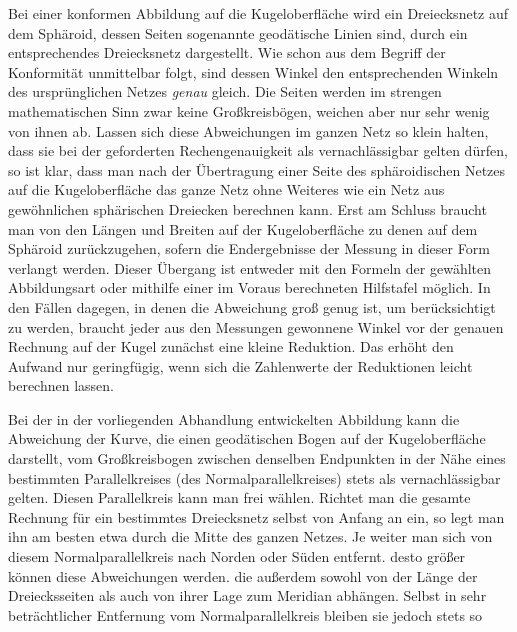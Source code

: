 %
\par\indent Bei einer konformen Abbildung auf die Kugeloberfläche wird ein Dreiecksnetz auf dem Sphäroid, dessen Seiten sogenannte geodätische Linien sind, durch ein entsprechendes Dreiecksnetz dargestellt. Wie schon aus dem Begriff der Konformität unmittelbar folgt, sind dessen Winkel den entsprechenden Winkeln des ursprünglichen Netzes \textit{genau} gleich. Die Seiten werden im strengen mathematischen Sinn zwar keine Großkreisbögen, weichen aber nur sehr wenig von ihnen ab. Lassen sich diese Abweichungen im ganzen Netz so klein halten, dass sie bei der geforderten Rechengenauigkeit als vernachlässigbar gelten dürfen, so ist klar, dass man nach der Übertragung einer Seite des sphäroidischen Netzes auf die Kugeloberfläche das ganze Netz ohne Weiteres wie ein Netz aus gewöhnlichen sphärischen Dreiecken berechnen kann. Erst am Schluss braucht man von den Längen und Breiten auf der Kugeloberfläche zu denen auf dem Sphäroid zurückzugehen, sofern die Endergebnisse der Messung in dieser Form verlangt werden. Dieser Übergang ist entweder mit den Formeln der gewählten Abbildungsart oder mithilfe einer im Voraus berechneten Hilfstafel möglich. In den Fällen dagegen, in denen die Abweichung groß genug ist, um berücksichtigt zu werden, braucht jeder aus den Messungen gewonnene Winkel vor der genauen Rechnung auf der Kugel zunächst eine kleine Reduktion. Das erhöht den Aufwand nur geringfügig, wenn sich die Zahlenwerte der Reduktionen leicht berechnen lassen.

Bei der in der vorliegenden Abhandlung entwickelten Abbildung kann die Abweichung der Kurve, die einen geodätischen Bogen auf der Kugeloberfläche darstellt, vom Großkreisbogen zwischen denselben Endpunkten in der Nähe eines bestimmten Parallelkreises (des Normalparallelkreises) stets als vernachlässigbar gelten. Diesen Parallelkreis kann man frei wählen. Richtet man die gesamte Rechnung für ein bestimmtes Dreiecksnetz selbst von Anfang an ein, so legt man ihn am besten etwa durch die Mitte des ganzen Netzes. Je weiter man sich von diesem Normalparallelkreis nach Norden oder Süden entfernt. desto größer können diese Abweichungen werden. die außerdem sowohl von der Länge der Dreiecksseiten als auch von ihrer Lage zum Meridian abhängen. Selbst in sehr beträchtlicher Entfernung vom Normalparallelkreis bleiben sie jedoch stets so %
